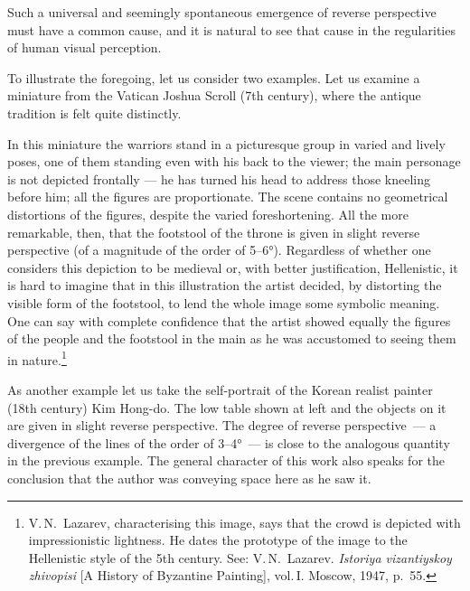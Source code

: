 Such a universal and seemingly spontaneous emergence of reverse perspective must have
a common cause, and it is natural to see that cause in the regularities of human
visual perception.

To illustrate the foregoing, let us consider two examples.  Let us examine a
miniature from the Vatican Joshua Scroll (7th century), where the antique tradition
is felt quite distinctly.


In this miniature the warriors stand in a picturesque group in varied and lively
poses, one of them standing even with his back to the viewer; the main personage is
not depicted frontally --- he has turned his head to address those kneeling before
him; all the figures are proportionate.  The scene contains no geometrical
distortions of the figures, despite the varied foreshortening.  All the more
remarkable, then, that the footstool of the throne is given in slight reverse
perspective (of a magnitude of the order of 5--6°).  Regardless of whether one
considers this depiction to be medieval or, with better justification, Hellenistic,
it is hard to imagine that in this illustration the artist decided, by distorting the
visible form of the footstool, to lend the whole image some symbolic meaning.  One
can say with complete confidence that the artist showed equally the figures of the
people and the footstool in the main as he was accustomed to seeing them in
nature.\footnote{V.\,N.~Lazarev, characterising this image, says that the crowd is
  depicted with impressionistic lightness.  He dates the prototype of the image to
  the Hellenistic style of the 5th century.  See: V.\,N.~Lazarev.
  \emph{Istoriya vizantiyskoy zhivopisi} [A History of Byzantine Painting], vol.\,I.
  Moscow, 1947, p.~55.}


As another example let us take the self-portrait of the Korean realist painter (18th
century) Kim Hong-do.  The low table shown at left and the objects on it are given in
slight reverse perspective.  The degree of reverse perspective~--- a divergence of
the lines of the order of 3--4°~--- is close to the analogous quantity in the
previous example.  The general character of this work also speaks for the conclusion
that the author was conveying space here as he saw it.


